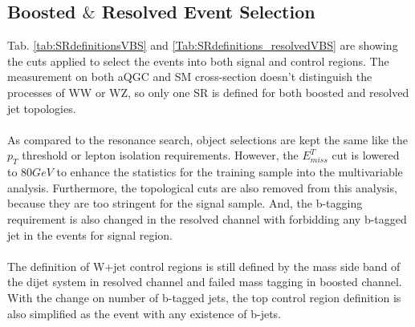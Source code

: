 \subsection{Boosted $\&$ Resolved Event Selection}
Tab. \ref{tab:SRdefinitionsVBS} and \ref{Tab:SRdefinitions_resolvedVBS} are showing the cuts applied to select the events into both signal and control regions. The measurement on both aQGC and SM cross-section doesn't distinguish the processes of WW or WZ, so only one SR is defined for both boosted and resolved jet topologies.
\\
\\As compared to the resonance search, object selections are kept the same like the $p_{T}$ threshold or lepton isolation requirements. However, the $E^{T}_{miss}$ cut is lowered to $80GeV$ to enhance the statistics for the training sample into the multivariable analysis. Furthermore, the topological cuts are also removed from this analysis, because they are too stringent for the signal sample. And, the b-tagging requirement is also changed in the resolved channel with forbidding any b-tagged jet in the events for signal region. 
\\
\\The definition of W+jet control regions is still defined by the mass side band of the dijet system in resolved channel and failed mass tagging in boosted channel. With the change on number of b-tagged jets, the top control region definition is also simplified as the event with any existence of b-jets.  
